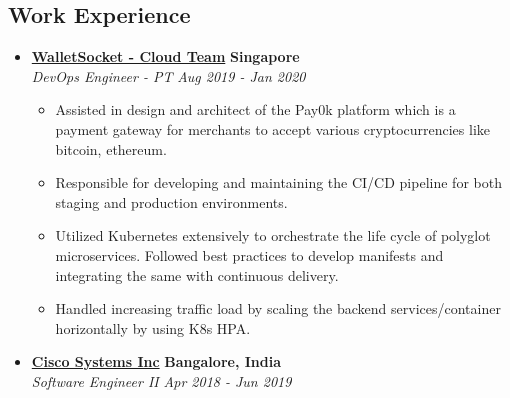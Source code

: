 \documentclass[10pt,letterpaper]{article}
\begin{document}
\subsection*{Work Experience}
  \begin{itemize}
    \parskip=-0.5em



    \item[]
    {\href{https://www.walletsocket.com/}{\textbf{WalletSocket - Cloud Team}} \hfill
      \textbf{Singapore}}
    \\
    {\emph{DevOps Engineer - PT} \hfill \emph{Aug 2019 - Jan 2020}}

    \begin{itemize}[label=\textbullet]
      \itemsep0em
      \item Assisted in design and architect of the Pay0k platform which is a payment gateway for merchants to accept various cryptocurrencies like bitcoin, ethereum.
      \item Responsible for developing and maintaining the CI/CD pipeline for both staging and production environments.
      \item Utilized Kubernetes extensively to orchestrate the life cycle of polyglot microservices. Followed best practices to develop manifests and integrating the same with continuous delivery.
      \item Handled increasing traffic load by scaling the backend services/container horizontally by using K8s HPA.
    \end{itemize}

    \item[]
    {\href{http://www.cisco.com}{\textbf{Cisco Systems Inc}} \hfill
      \textbf{Bangalore, India}}
    \\
    {\emph{Software Engineer II} \hfill \emph{Apr 2018 - Jun 2019}}


\end{itemize}
\end{document}
